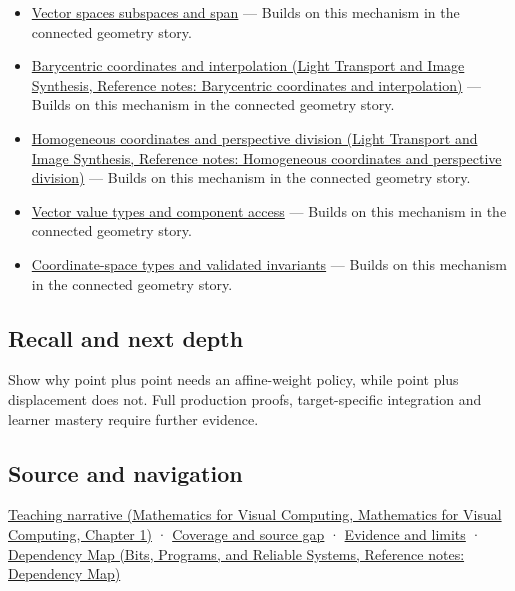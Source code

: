 \begin{itemize}
\tightlist
\item
  \hyperref[appendix-173b52c063ae]{Vector spaces subspaces and span} --- Builds on this mechanism in the connected geometry story.
\item
  \href{../04-Light-Transport-and-Image-Synthesis/main.pdf\#nameddest=appendix-02b9d9a81dca}{Barycentric coordinates and interpolation (Light Transport and Image Synthesis, Reference notes: Barycentric coordinates and interpolation)} --- Builds on this mechanism in the connected geometry story.
\item
  \href{../04-Light-Transport-and-Image-Synthesis/main.pdf\#nameddest=appendix-cb3b26862282}{Homogeneous coordinates and perspective division (Light Transport and Image Synthesis, Reference notes: Homogeneous coordinates and perspective division)} --- Builds on this mechanism in the connected geometry story.
\item
  \hyperref[appendix-37a39984ba66]{Vector value types and component access} --- Builds on this mechanism in the connected geometry story.
\item
  \hyperref[appendix-380a220e2529]{Coordinate-space types and validated invariants} --- Builds on this mechanism in the connected geometry story.
\end{itemize}

\subsection{Recall and next depth}\label{appendix-0659864c0aa3-recall-and-next-depth}

Show why point plus point needs an affine-weight policy, while point plus displacement does not. Full production proofs, target-specific integration and learner mastery require further evidence.

\subsection{Source and navigation}\label{appendix-0659864c0aa3-source-and-navigation}

\href{../02-Mathematics-for-Visual-Computing/main.pdf\#nameddest=01-foundations-i-ch017-an-arrow-is-not-the-address-written-beside-it}{Teaching narrative (Mathematics for Visual Computing, Mathematics for Visual Computing, Chapter 1)} · \hyperref[appendix-fd090d982a15-phase-6---parts-501-600]{Coverage and source gap} · \hyperref[appendix-a103e7846d21-phase-6---source-analysis-and-verification]{Evidence and limits} · \href{../01-Bits-Programs-and-Reliable-Systems/main.pdf\#nameddest=appendix-4ad47bdd269a}{Dependency Map (Bits, Programs, and Reliable Systems, Reference notes: Dependency Map)}
